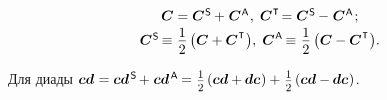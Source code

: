 \nopagebreak\vspace{-0.1em}\begin{equation}\begin{array}{c}
\bm{C} = \bm{C}^{\mathsf{\hspace{.1ex}S}} \hspace{-0.1ex}+\hspace{.1ex} \bm{C}^{\mathsf{\hspace{.1ex}A}}\hspace{.1ex} , \;
\bm{C}^{\hspace{.1ex}\T} \hspace{-0.33ex} = \bm{C}^{\mathsf{\hspace{.1ex}S}} \hspace{-0.1ex}-\hspace{.1ex} \bm{C}^{\mathsf{\hspace{.1ex}A}}
\hspace{.2ex} ;
\\[0.2em]
\bm{C}^{\mathsf{\hspace{.1ex}S}} \hspace{-0.22ex} \equiv \hspace{.1ex} \displaystyle \onehalf \left( {\bm{C} + \bm{C}^{\hspace{.1ex}\T}}\hspace{.1ex} \right)\!, \;
\bm{C}^{\mathsf{\hspace{.1ex}A}} \hspace{-0.22ex} \equiv \hspace{.1ex} \displaystyle \onehalf \left( {\bm{C} - \bm{C}^{\hspace{.1ex}\T}}\hspace{.1ex} \right)\!.
\end{array}\end{equation}

\noindent Для диады ${\bm{c}\bm{d} \hspace{.1ex} = \bm{c}\bm{d}^{\mathsf{\hspace{.25ex}S}} \hspace{-0.2ex} + \hspace{.1ex} \bm{c}\bm{d}^{\mathsf{\hspace{.25ex}A}} \hspace{-0.16ex} = \hspace{.1ex}
\smalldisplaystyleonehalf \hspace{-0.1ex} \left( \bm{c}\bm{d} + \hspace{-0.1ex} \bm{d}\bm{c} \hspace{.1ex} \right)
+ \hspace{.16ex} \smalldisplaystyleonehalf \hspace{-0.1ex} \left( \bm{c} \bm{d} - \hspace{-0.1ex} \bm{d} \bm{c} \hspace{.1ex} \right)}$.

